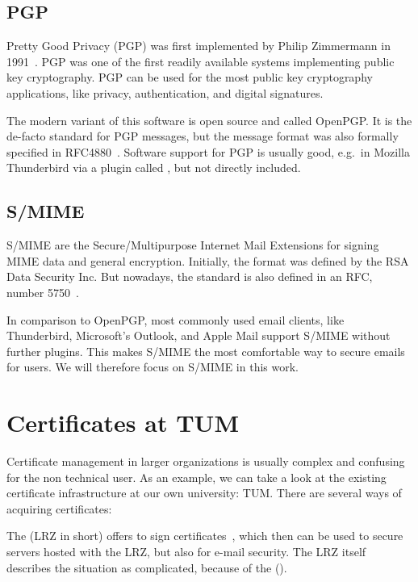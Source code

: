 \subsection{PGP}\label{subsec:pgp}
Pretty Good Privacy (PGP) was first implemented by Philip Zimmermann in 1991~\cite{zimmermann1995official}.
PGP was one of the first readily available systems implementing public key cryptography.
PGP can be used for the most public key cryptography applications, like privacy, authentication, and digital signatures.

The modern variant of this software is open source and called OpenPGP\@.
It is the de-facto standard for PGP messages, but the message format was also formally specified in
RFC4880~\cite{RFC4880}.
Software support for PGP is usually good, e.g.\ in Mozilla Thunderbird via a plugin called , but not
directly included.

\subsection{S/MIME}\label{subsec:s/mime}
S/MIME are the Secure/Multipurpose Internet Mail Extensions for signing MIME data and general encryption.
Initially, the format was defined by the RSA Data Security Inc.
But nowadays, the standard is also defined in an RFC, number 5750~\cite{RFC5750}.

In comparison to OpenPGP, most commonly used email clients, like Thunderbird, Microsoft's Outlook, and Apple Mail
support S/MIME without further plugins.
This makes S/MIME the most comfortable way to secure emails for users.
We will therefore focus on S/MIME in this work.

\section{Certificates at TUM}\label{sec:certificatesAtTum}
Certificate management in larger organizations is usually complex and confusing for the non technical user.
As an example, we can take a look at the existing certificate infrastructure at our own university: TUM\@.
There are several ways of acquiring certificates:

The  (LRZ in short) offers to sign
certificates~\cite{lrzpki}, which then can be used to secure servers hosted with the LRZ, but also for e-mail security.
The LRZ itself describes the situation as complicated, because of the 
().

